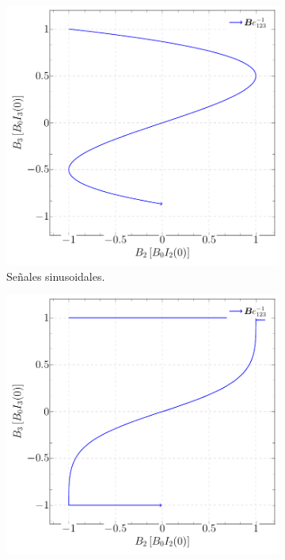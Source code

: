 \begin{figure}[htbp!]
	\centering
	\begin{subfigure}{0.32\linewidth}
		\includegraphics[width=\linewidth]{../Figures/Uniform-Field/B-sin-sin.pdf}
		\caption{Señales sinusoidales.}
		\label{fig:b_sin_sin}
	\end{subfigure}
	\hfill
	\begin{subfigure}{0.32\linewidth}
		\includegraphics[width=\linewidth]{../Figures/Uniform-Field/B-square-square.pdf}

\end{subfigure}
\end{figure}
